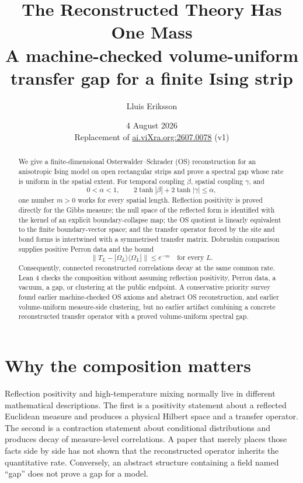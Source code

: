 \documentclass[11pt]{article}
\title{\textbf{The Reconstructed Theory Has One Mass}\\[4pt]
\large A machine-checked volume-uniform transfer gap for a finite Ising strip}
\author{Lluis Eriksson}
\date{4 August 2026\\[4pt]
\small Replacement of \href{https://www.ai.vixra.org/abs/2607.0078}{ai.viXra.org:2607.0078} (v1)}
\newcommand{\vac}{\Omega}
\newcommand{\norm}[1]{\lVert #1\rVert}
\begin{document}
\maketitle

\begin{abstract}
We give a finite-dimensional Osterwalder--Schrader (OS) reconstruction for an
anisotropic Ising model on open rectangular strips and prove a spectral gap
whose rate is uniform in the spatial extent.  For temporal coupling $\beta$,
spatial coupling $\gamma$, and
\[
  0<\alpha<1,\qquad
  2\tanh |\beta|+2\tanh |\gamma|\leq \alpha,
\]
one number $m>0$ works for every spatial length.  Reflection positivity is
proved directly for the Gibbs measure; the null space of the reflected form
is identified with the kernel of an explicit boundary-collapse map; the OS
quotient is linearly equivalent to the finite boundary-vector space; and the
transfer operator forced by the site and bond forms is intertwined with a
symmetrised transfer matrix.  Dobrushin comparison supplies positive Perron
data and the bound
\[
 \norm{T_L-|\vac_L\rangle\langle\vac_L|}\leq e^{-m}
 \quad\text{for every }L.
\]
Consequently, connected reconstructed correlations decay at the same common
rate.  Lean 4 checks the composition without assuming reflection positivity,
Perron data, a vacuum, a gap, or clustering at the public endpoint.  A
conservative priority survey found earlier machine-checked OS axioms and
abstract OS reconstruction, and earlier volume-uniform measure-side
clustering, but no earlier artifact combining a concrete reconstructed
transfer operator with a proved volume-uniform spectral gap.
\end{abstract}

\section{Why the composition matters}

Reflection positivity and high-temperature mixing normally live in different
mathematical descriptions.  The first is a positivity statement about a
reflected Euclidean measure and produces a physical Hilbert space and a
transfer operator.  The second is a contraction statement about conditional
distributions and produces decay of measure-level correlations.  A paper that
merely places those facts side by side has not shown that the reconstructed
operator inherits the quantitative rate.  Conversely, an abstract structure
containing a field named ``gap'' does not prove a gap for a model.
\end{document}
